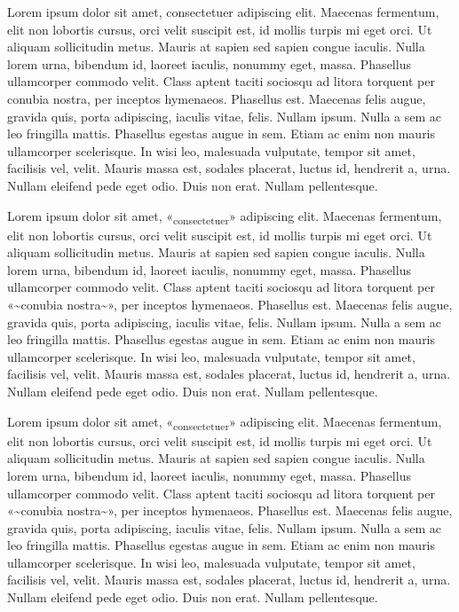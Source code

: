 Lorem ipsum dolor sit amet, consectetuer adipiscing elit. Maecenas
fermentum, elit non lobortis cursus, orci velit suscipit est, id mollis
turpis mi eget orci. Ut aliquam sollicitudin metus. Mauris at sapien sed
sapien congue iaculis. Nulla lorem urna, bibendum id, laoreet iaculis,
nonummy eget, massa. Phasellus ullamcorper commodo velit. Class aptent
taciti sociosqu ad litora torquent per conubia nostra, per inceptos
hymenaeos. Phasellus est. Maecenas felis augue, gravida quis, porta
adipiscing, iaculis vitae, felis. Nullam ipsum. Nulla a sem ac leo
fringilla mattis. Phasellus egestas augue in sem. Etiam ac enim non
mauris ullamcorper scelerisque. In wisi leo, malesuada vulputate, tempor
sit amet, facilisis vel, velit. Mauris massa est, sodales placerat,
luctus id, hendrerit a, urna. Nullam eleifend pede eget odio. Duis non
erat. Nullam pellentesque.

Lorem ipsum dolor sit amet, «\textsubscript{consectetuer}» adipiscing
elit. Maecenas fermentum, elit non lobortis cursus, orci velit suscipit
est, id mollis turpis mi eget orci. Ut aliquam sollicitudin metus.
Mauris at sapien sed sapien congue iaculis. Nulla lorem urna, bibendum
id, laoreet iaculis, nonummy eget, massa. Phasellus ullamcorper commodo
velit. Class aptent taciti sociosqu ad litora torquent per
«\textasciitilde conubia nostra\textasciitilde», per inceptos hymenaeos.
Phasellus est. Maecenas felis augue, gravida quis, porta adipiscing,
iaculis vitae, felis. Nullam ipsum. Nulla a sem ac leo fringilla mattis.
Phasellus egestas augue in sem. Etiam ac enim non mauris ullamcorper
scelerisque. In wisi leo, malesuada vulputate, tempor sit amet,
facilisis vel, velit. Mauris massa est, sodales placerat, luctus id,
hendrerit a, urna. Nullam eleifend pede eget odio. Duis non erat. Nullam
pellentesque.

Lorem ipsum dolor sit amet, «\textsubscript{consectetuer}» adipiscing
elit. Maecenas fermentum, elit non lobortis cursus, orci velit suscipit
est, id mollis turpis mi eget orci. Ut aliquam sollicitudin metus.
Mauris at sapien sed sapien congue iaculis. Nulla lorem urna, bibendum
id, laoreet iaculis, nonummy eget, massa. Phasellus ullamcorper commodo
velit. Class aptent taciti sociosqu ad litora torquent per
«\textasciitilde conubia nostra\textasciitilde», per inceptos hymenaeos.
Phasellus est. Maecenas felis augue, gravida quis, porta adipiscing,
iaculis vitae, felis. Nullam ipsum. Nulla a sem ac leo fringilla mattis.
Phasellus egestas augue in sem. Etiam ac enim non mauris ullamcorper
scelerisque. In wisi leo, malesuada vulputate, tempor sit amet,
facilisis vel, velit. Mauris massa est, sodales placerat, luctus id,
hendrerit a, urna. Nullam eleifend pede eget odio. Duis non erat. Nullam
pellentesque.

